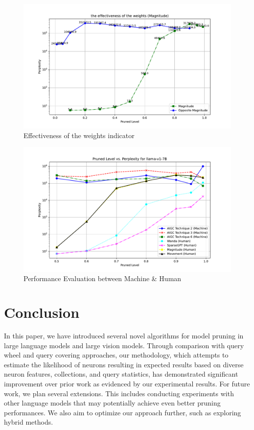 \documentclass{article} %
\begin{document}
\begin{figure}[h]
\begin{center}
\includegraphics[width=0.8\linewidth]{fig2.pdf}
\end{center}
\caption{Effectiveness of the weights indicator}
\label{fig:weights}
\end{figure}

\begin{figure}[h]
\begin{center}
\includegraphics[width=0.8\linewidth]{fig3.pdf}
\end{center}
\caption{Performance Evaluation between Machine \& Human}
\label{fig:humanandmachine}
\end{figure}

\section{Conclusion}
\label{conclue}

In this paper, we have introduced several novel algorithms for model pruning in large language models and large vision models. Through comparison with query wheel and query covering approaches, our methodology, which attempts to estimate the likelihood of neurons resulting in expected results based on diverse neuron features, collections, and query statistics, has demonstrated significant improvement over prior work as evidenced by our experimental results. For future work, we plan several extensions. This includes conducting experiments with other language models that may potentially achieve even better pruning performances. We also aim to optimize our approach further, such as exploring hybrid methods.
\end{document}
